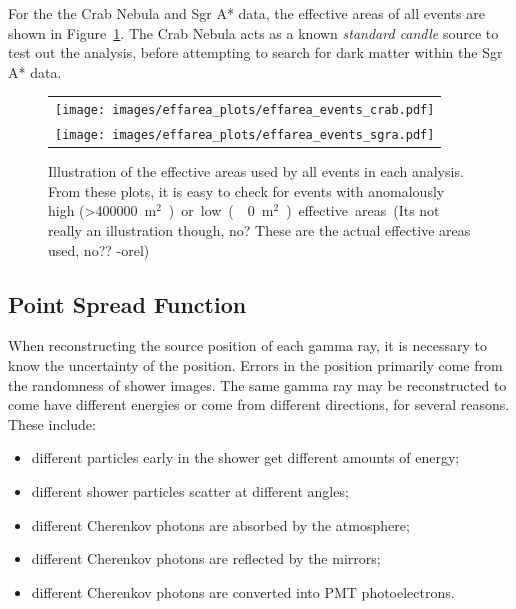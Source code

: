 For the the Crab Nebula and Sgr A* data, the effective areas of all events are shown in Figure~\ref{fig:effarea_usage}.
The Crab Nebula acts as a known \textit{standard candle} source to test out the analysis, before attempting to search for dark matter within the Sgr A* data.
    
    \begin{figure}[!t]
      \centering
      \begin{tabular}{c}
        \texttt{[image: images/effarea\_plots/effarea\_events\_crab.pdf]} \\
        \texttt{[image: images/effarea\_plots/effarea\_events\_sgra.pdf]}
      \end{tabular}
      \caption[Effective Areas Used]{
      Illustration of the effective areas used by all events in each analysis.
      From these plots, it is easy to check for events with anomalously high (>\SI{400000}{m${}^2$}) or low (\nicetilde\SI{0}{m${}^2$}) effective areas.
      {\color{red}(Its not really an illustration though, no? These are the actual effective areas used, no?? -orel)}
      }
      \label{fig:effarea_usage}
    \end{figure}
  
  \FloatBarrier

  \subsection{Point Spread Function}\label{subsec:psf}

    When reconstructing the source position of each gamma ray, it is necessary to know the uncertainty of the position.
    Errors in the position primarily come from the randomness of shower images.
    The same gamma ray may be reconstructed to come have different energies or come from different directions, for several reasons.
    These include:
    \begin{itemize}[label=$\bullet$,noitemsep]
      \item different particles early in the shower get different amounts of energy;
      \item different shower particles scatter at different angles;
      \item different Cherenkov photons are absorbed by the atmosphere;
      \item different Cherenkov photons are reflected by the mirrors;
      \item different Cherenkov photons are converted into PMT photoelectrons.
    \end{itemize}
    
